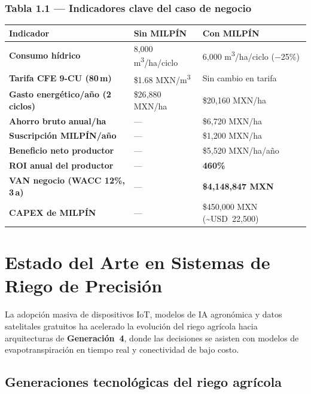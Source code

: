 \documentclass[12pt,letterpaper]{article}
\newcommand{\tH}[1]{\cellcolor{azulOscuro}\color{white}\bfseries\small #1}
\newcommand{\fA}{\rowcolor{azulFila}}
\begin{document}
\subsubsection*{Tabla 1.1 — Indicadores clave del caso de negocio}
\begin{tabularx}{\textwidth}{>{\bfseries\small}p{6.2cm} X X}
\toprule
\tH{Indicador} & \tH{Sin MILPÍN} & \tH{Con MILPÍN} \\
\midrule
Consumo hídrico               & 8{,}000 m\textsuperscript{3}/ha/ciclo  & 6{,}000 m\textsuperscript{3}/ha/ciclo (−25\%) \\
\fA Tarifa CFE 9-CU (80\,m)  & \$1.68 MXN/m\textsuperscript{3}       & Sin cambio en tarifa \\
Gasto energético/año (2 ciclos) & \$26{,}880 MXN/ha                  & \$20{,}160 MXN/ha \\
\fA Ahorro bruto anual/ha     & —                                     & \$6{,}720 MXN/ha \\
Suscripción MILPÍN/año        & —                                     & \$1{,}200 MXN/ha \\
\fA Beneficio neto productor  & —                                     & \$5{,}520 MXN/ha/año \\
ROI anual del productor       & —                                     & \textbf{460\%} \\
\fA VAN negocio (WACC 12\%, 3\,a) & —                                & \textbf{\$4{,}148{,}847 MXN} \\
CAPEX de MILPÍN               & —                                     & \$450{,}000 MXN (\textasciitilde{}USD~22{,}500) \\
\bottomrule
\end{tabularx}

\newpage

\section{Estado del Arte en Sistemas de Riego de Precisión}

La adopción masiva de dispositivos IoT, modelos de IA agronómica y datos satelitales
gratuitos ha acelerado la evolución del riego agrícola hacia arquitecturas de
\textbf{Generación~4}, donde las decisiones se asisten con modelos de evapotranspiración
en tiempo real y conectividad de bajo costo.

\subsection{Generaciones tecnológicas del riego agrícola}
\end{document}
